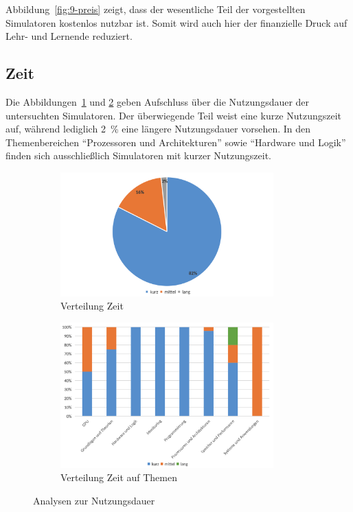 Abbildung~\ref{fig:9-preis} zeigt, dass der wesentliche Teil der vorgestellten Simulatoren kostenlos nutzbar ist. Somit wird auch hier der finanzielle Druck auf Lehr- und Lernende reduziert.

\subsection{Zeit}

Die Abbildungen~\ref{fig:12-zeit} und \ref{fig:13-vorwissen-thema} geben Aufschluss über die Nutzungsdauer der untersuchten Simulatoren. Der überwiegende Teil weist eine kurze Nutzungszeit auf, während lediglich 2~\% eine längere Nutzungsdauer vorsehen. In den Themenbereichen \enquote{Prozessoren und Architekturen} sowie \enquote{Hardware und Logik} finden sich ausschließlich Simulatoren mit kurzer Nutzungszeit.

\begin{figure}[!htbp]
    \centering
    \begin{subfigure}[b]{0.48\textwidth}
        \centering
        \includegraphics[width=0.90\textwidth]{graphics_sim/12-zeit.png}
        \caption{Verteilung Zeit}
        \label{fig:12-zeit}
    \end{subfigure}
    \hfill
    \begin{subfigure}[b]{0.48\textwidth}
        \centering
        \includegraphics[width=0.90\textwidth]{graphics_sim/13-zeit-thema.png}
        \caption{Verteilung Zeit auf Themen}
        \label{fig:13-vorwissen-thema}
    \end{subfigure}
    \caption{Analysen zur Nutzungsdauer}
    \label{fig:nutzungsdauer-gesamt}
\end{figure}

